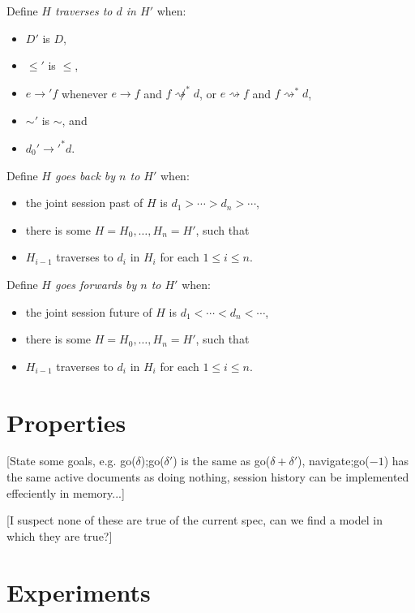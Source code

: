 \documentclass{article}
\newcommand{\aNH}{H}
\newcommand{\Docs}{D}
\newcommand{\parentOf}{\rightarrow}
\newcommand{\leChron}{\le}
\newcommand{\ltChron}{<}
\newcommand{\gtChron}{>}
\newcommand{\eqSess}{\sim}
\newcommand{\parentOfSess}{\rightsquigarrow}
\newcommand{\rootDoc}{d_0}
\newcommand{\aDoc}{d}
\newcommand{\bDoc}{e}
\newcommand{\cDoc}{f}
\begin{document}
Define \emph{$\aNH$ traverses to $\aDoc$ in $\aNH'$} when:
\begin{itemize}
\item $\Docs'$ is $\Docs$,
\item $\leChron'$ is $\leChron$,
\item $\bDoc \parentOf' \cDoc$ whenever
  $\bDoc \parentOf \cDoc$ and $\cDoc \not\parentOfSess^* \aDoc$, or
  $\bDoc \parentOfSess \cDoc$ and $\cDoc \parentOfSess^* \aDoc$,
\item $\eqSess'$ is $\eqSess$, and
\item $\rootDoc' \parentOf'^* \aDoc$.
\end{itemize}
Define \emph{$\aNH$ goes back by $n$ to $\aNH'$} when:
\begin{itemize}
\item the joint session past of $\aNH$ is $\aDoc_1 \gtChron \cdots \gtChron \aDoc_n \gtChron \cdots$,
\item there is some $\aNH=\aNH_0,\ldots,\aNH_n=\aNH'$, such that
\item $H_{i-1}$ traverses to $d_i$ in $H_i$ for each $1 \le i \le n$.
\end{itemize}
Define \emph{$\aNH$ goes forwards by $n$ to $\aNH'$} when:
\begin{itemize}
\item the joint session future of $\aNH$ is $\aDoc_1 \ltChron \cdots \ltChron \aDoc_n \ltChron \cdots$,
\item there is some $\aNH=\aNH_0,\ldots,\aNH_n=\aNH'$, such that
\item $H_{i-1}$ traverses to $d_i$ in $H_i$ for each $1 \le i \le n$.
\end{itemize}

\section{Properties}

[State some goals, e.g. go($\delta$);go($\delta'$) is the same as go($\delta+\delta'$),
  navigate;go($-1$) has the same active documents as doing nothing,
  session history can be implemented effeciently in memory...]

[I suspect none of these are true of the current spec, can we find a model in which
  they are true?]

\section{Experiments}
\end{document}
